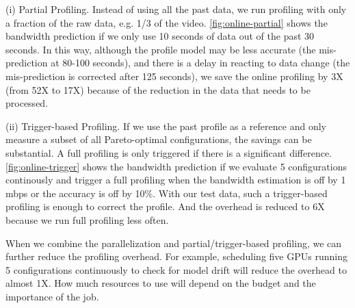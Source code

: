 (i) Partial Profiling. Instead of using all the past data, we run profiling with
only a fraction of the raw data, e.g. 1/3 of the video.
\autoref{fig:online-partial} shows the bandwidth prediction if we only use 10
seconds of data out of the past 30 seconds. In this way, although the profile
model may be less accurate (the mis-prediction at 80-100 seconds), and there is
a delay in reacting to data change (the mis-prediction is corrected after 125
seconds), we save the online profiling by 3X (from 52X to 17X) because of the
reduction in the data that needs to be processed.

(ii) Trigger-based Profiling. If we use the past profile as a reference and only
measure a subset of all Pareto-optimal configurations, the savings can be
substantial. A full profiling is only triggered if there is a significant
difference. \autoref{fig:online-trigger} shows the bandwidth prediction if we
evaluate 5 configurations continously and trigger a full profiling when the
bandwidth estimation is off by 1 mbps or the accuracy is off by 10\%. With our
test data, such a trigger-based profiling is enough to correct the profile.  And
the overhead is reduced to 6X because we run full profiling less often.

When we combine the parallelization and partial/trigger-based profiling, we can
further reduce the profiling overhead. For example, scheduling five GPUs running
5 configurations continuously to check for model drift will reduce the overhead
to almost 1X. How much resources to use will depend on the budget and the
importance of the job.

